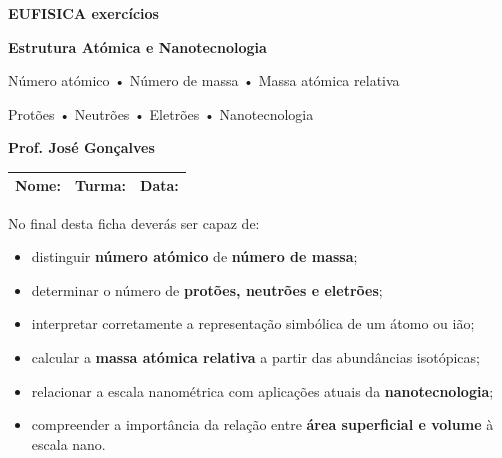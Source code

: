 \documentclass[11pt,a4paper]{article}
\begin{document}
	
	
	\begin{tcolorbox}[
		enhanced,
		colback=eudark,
		colframe=eudark,
		arc=3mm,
		boxrule=0pt,
		left=5mm,
		right=5mm,
		top=5mm,
		bottom=5mm
		]
		\begin{center}
			
			{\Huge\bfseries\color{white} EUFISICA exercícios}
			
			\vspace{2mm}
			
			{\Large\bfseries\color{white}
				Estrutura Atómica e Nanotecnologia}
			
			\vspace{3mm}
			
			{\large\color{eulightblue}
				Número atómico • Número de massa • Massa atómica relativa}
			
			{\large\color{eulightblue}
				Protões • Neutrões • Eletrões • Nanotecnologia}
			
			\vspace{3mm}
			
			{\color{white}\textbf{Prof. José Gonçalves}}
			
		\end{center}
	\end{tcolorbox}
	
	\vspace{3mm}
	
	\begin{tabularx}{\textwidth}{|X|X|X|}
		\hline
		\textbf{Nome:} & \textbf{Turma:} & \textbf{Data:} \\[6mm]
		\hline
	\end{tabularx}
	
	\vspace{5mm}
	
	
	\begin{tcolorbox}[
		colback=eugray,
		colframe=eudark,
		title=\textbf{Objetivos de aprendizagem}
		]
		No final desta ficha deverás ser capaz de:
		
		\begin{itemize}[leftmargin=6mm,itemsep=1mm]
			\item distinguir \textbf{número atómico} de \textbf{número de massa};
			\item determinar o número de \textbf{protões, neutrões e eletrões};
			\item interpretar corretamente a representação simbólica de um átomo ou ião;
			\item calcular a \textbf{massa atómica relativa} a partir das abundâncias isotópicas;
			\item relacionar a escala nanométrica com aplicações atuais da \textbf{nanotecnologia};
			\item compreender a importância da relação entre \textbf{área superficial e volume} à escala nano.
		\end{itemize}
	\end{tcolorbox}
	
\end{document}
